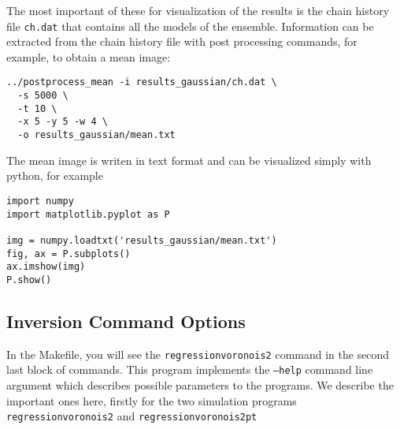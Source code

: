 \documentclass[a4paper,12pt]{article}
\begin{document}
The most important of these for visualization of the results is the chain
history file {\tt ch.dat} that contains all the models of the ensemble.
Information can be extracted from the chain history file with post processing
commands, for example, to obtain a mean image:

\begin{verbatim}
../postprocess_mean -i results_gaussian/ch.dat \
  -s 5000 \
  -t 10 \
  -x 5 -y 5 -w 4 \
  -o results_gaussian/mean.txt
\end{verbatim}

The mean image is writen in text format and can be visualized simply
with python, for example

\begin{verbatim}
import numpy
import matplotlib.pyplot as P

img = numpy.loadtxt('results_gaussian/mean.txt')
fig, ax = P.subplots()
ax.imshow(img)
P.show()
\end{verbatim}

\subsection{Inversion Command Options}

In the Makefile, you will see the {\tt regressionvoronois2} command in the second
last block of commands. This program implements the {\tt --help} command line argument
which describes possible parameters to the programs. We describe the
important ones here, firstly for the two simulation programs {\tt regressionvoronois2}
and {\tt regressionvoronois2pt}
\end{document}
